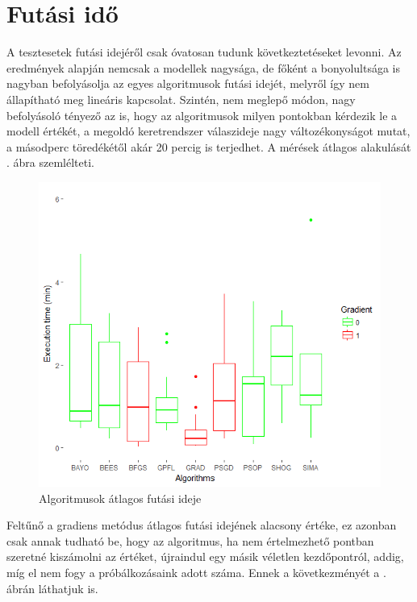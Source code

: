 \section{Futási idő}
A tesztesetek futási idejéről csak óvatosan tudunk következtetéseket levonni. Az eredmények alapján nemcsak a modellek nagysága, de főként a bonyolultsága is nagyban befolyásolja az egyes algoritmusok futási idejét, melyről így nem állapítható meg lineáris kapcsolat. Szintén, nem meglepő módon, nagy befolyásoló tényező az is, hogy az algoritmusok milyen pontokban kérdezik le a modell értékét, a megoldó keretrendszer válaszideje nagy változékonyságot mutat, a másodperc töredékétől akár 20 percig is terjedhet. A mérések átlagos alakulását . ábra szemlélteti.
\begin{figure}[!ht]
	\centering
	\includegraphics[width=140mm, keepaspectratio]{figures/execution_times_dobozdiagram.png}
	\caption{Algoritmusok átlagos futási ideje}
	\label{fig:exectime}
\end{figure}

Feltűnő a gradiens metódus átlagos futási idejének alacsony értéke, ez azonban csak annak tudható be, hogy az algoritmus, ha nem értelmezhető pontban szeretné kiszámolni az értéket, újraindul egy másik véletlen kezdőpontról, addig, míg el nem fogy a próbálkozásaink adott száma. Ennek a következményét a . ábrán láthatjuk is.

